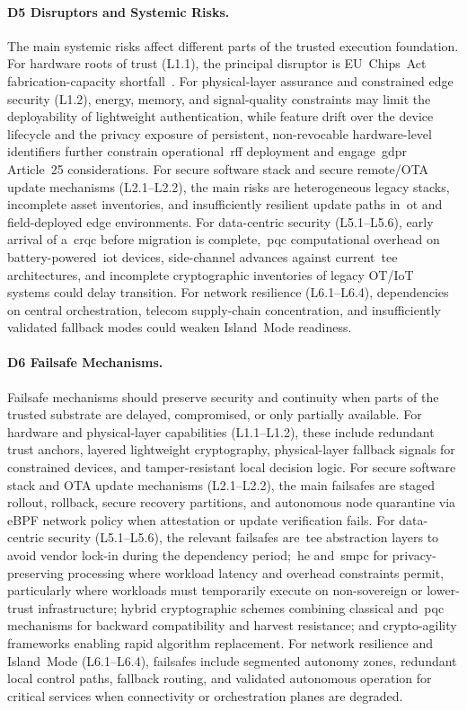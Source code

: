 \documentclass{ieeeaccess}
\begin{document}
\paragraph{D5 Disruptors and Systemic Risks.}

The main systemic risks affect different parts of the trusted execution foundation. For hardware roots of trust (L1.1), the principal disruptor is EU~Chips~Act fabrication-capacity shortfall~\cite{eurochipsaudit2025}. For physical-layer assurance and constrained edge security (L1.2), energy, memory, and signal-quality constraints may limit the deployability of lightweight authentication, while feature drift over the device lifecycle and the privacy exposure of persistent, non-revocable hardware-level identifiers further constrain operational~\gls{rff} deployment and engage~\gls{gdpr} Article~25 considerations. For secure software stack and secure remote/OTA update mechanisms (L2.1--L2.2), the main risks are heterogeneous legacy stacks, incomplete asset inventories, and insufficiently resilient update paths in~\gls{ot} and field-deployed edge environments. For data-centric security (L5.1--L5.6), early arrival of a~\gls{crqc} before migration is complete,~\gls{pqc} computational overhead on battery-powered~\gls{iot} devices, side-channel advances against current~\gls{tee} architectures, and incomplete cryptographic inventories of legacy OT/IoT systems could delay transition. For network resilience (L6.1--L6.4), dependencies on central orchestration, telecom supply-chain concentration, and insufficiently validated fallback modes could weaken Island~Mode readiness.

\paragraph{D6 Failsafe Mechanisms.}
Failsafe mechanisms should preserve security and continuity when parts of the trusted substrate are delayed, compromised, or only partially available. For hardware and physical-layer capabilities (L1.1--L1.2), these include redundant trust anchors, layered lightweight cryptography, physical-layer fallback signals for constrained devices, and tamper-resistant local decision logic. For secure software stack and OTA update mechanisms (L2.1--L2.2), the main failsafes are staged rollout, rollback, secure recovery partitions, and autonomous node quarantine via eBPF network policy when attestation or update verification fails. For data-centric security (L5.1--L5.6), the relevant failsafes are~\gls{tee} abstraction layers to avoid vendor lock-in during the dependency period;~\gls{he} and~\gls{smpc} for privacy-preserving processing where workload latency and overhead constraints permit, particularly where workloads must temporarily execute on non-sovereign or lower-trust infrastructure; hybrid cryptographic schemes combining classical and~\gls{pqc} mechanisms for backward compatibility and harvest resistance; and crypto-agility frameworks enabling rapid algorithm replacement. For network resilience and Island~Mode (L6.1--L6.4), failsafes include segmented autonomy zones, redundant local control paths, fallback routing, and validated autonomous operation for critical services when connectivity or orchestration planes are degraded.
\end{document}

